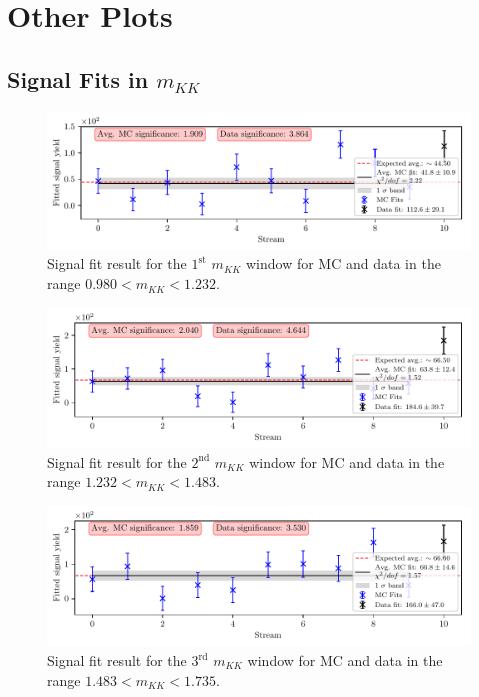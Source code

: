 \chapter{Other Plots}

\section{Signal Fits in \texorpdfstring{$m_{KK}$}{mKK}}
\label{sec:mKK_plots}

\begin{figure}[H]
	\centering
	\captionsetup{width=0.8\linewidth}
	\includegraphics[width=\linewidth]{fig/sig_mKK_1}
	\caption{Signal fit result for the $1^{\mathrm{st}}$ $m_{KK}$ window for MC and data in the range $0.980<m_{KK}<1.232$.}
\end{figure}

\begin{figure}[H]
	\centering
	\captionsetup{width=0.8\linewidth}
	\includegraphics[width=\linewidth]{fig/sig_mKK_2}
	\caption{Signal fit result for the $2^{\mathrm{nd}}$ $m_{KK}$ window for MC and data in the range $1.232<m_{KK}<1.483$.}
\end{figure}

\begin{figure}[H]
	\centering
	\captionsetup{width=0.8\linewidth}
	\includegraphics[width=\linewidth]{fig/sig_mKK_3}
	\caption{Signal fit result for the $3^{\mathrm{rd}}$ $m_{KK}$ window for MC and data in the range $1.483<m_{KK}<1.735$.}
\end{figure}

